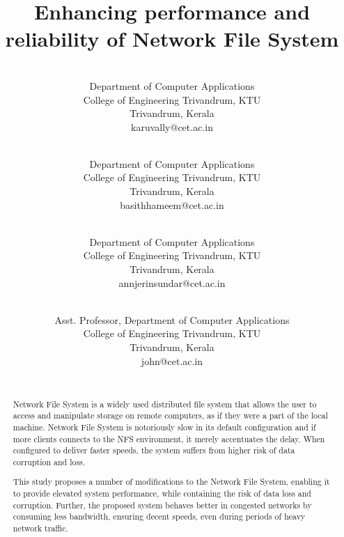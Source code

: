 \documentclass[conference]{IEEEtran}
\begin{document}
\title{Enhancing performance and reliability of Network File System\\
}

\author{
\\
Department of Computer Applications \\
College of Engineering Trivandrum, KTU\\
Trivandrum, Kerala \\
karuvally@cet.ac.in\\
\and {}\\
Department of Computer Applications \\
College of Engineering Trivandrum, KTU\\
Trivandrum, Kerala \\
basithhameem@cet.ac.in\\
\and {}\\
Department of Computer Applications \\
College of Engineering Trivandrum, KTU\\
Trivandrum, Kerala  \\
annjerinsundar@cet.ac.in\\
\and {}\\
Asst. Professor, Department of Computer Applications \\
College of Engineering Trivandrum, KTU\\
Trivandrum, Kerala \\
john@cet.ac.in\\
\\
}
\maketitle

\begin{abstract}
Network File System is a widely used distributed file system that allows the
user to access and manipulate storage on remote computers, as if they were a
part of the local machine. Network File System is notoriously slow in its 
default configuration and if more clients connects to the NFS environment,
it merely accentuates the delay. When configured to deliver faster speeds,
the system suffers from higher risk of data corruption and loss.

This study proposes a number of modifications to the Network File System,
enabling it to provide elevated system performance, while containing
the risk of data loss and corruption. Further, the proposed system behaves
better in congested networks by consuming less bandwidth, ensuring decent
speeds, even during periods of heavy network traffic.
\end{abstract}
\end{document}
